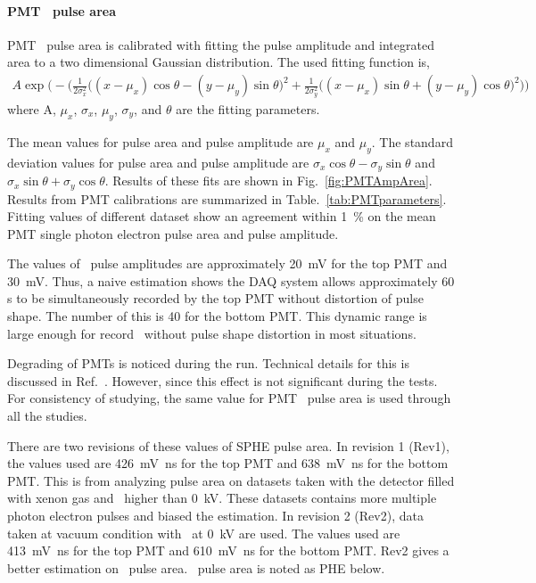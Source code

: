 \paragraph{PMT \sphe\ pulse area}
 PMT \sphe\ pulse area is calibrated with fitting the pulse amplitude and integrated area to a two dimensional Gaussian distribution. The used fitting function is, 
 \begin{align}
 	A \exp \bigg( -\Big(\frac{1}{2 \sigma_x^2} \big( (x-\mu_{x})\cos \theta - (y-\mu_y)\sin \theta \big) ^2 + \frac{1}{2 \sigma_y^2} \big( (x-\mu_{x})\sin \theta + (y-\mu_y)\cos \theta \big) ^2  \Big) \bigg)
 \end{align} 
where A, $\mu_{x}$, $\sigma_{x}$, $\mu_{y}$, $\sigma_{y}$, and $\theta$ are the fitting parameters.  

The mean values for pulse area and pulse amplitude are $\mu_{x}$ and $\mu_{y}$. The standard deviation values for pulse area and pulse amplitude are $\sigma_{x} \cos \theta - \sigma_{y} \sin \theta$ and $\sigma_{x} \sin \theta + \sigma_{y} \cos \theta$. Results of these fits are shown in Fig.~\ref{fig:PMTAmpArea}. Results from PMT calibrations are summarized in Table.~\ref{tab:PMTparameters}. Fitting values of different dataset show an agreement within \SI{1}{\percent} on the mean PMT single photon electron pulse area and pulse amplitude. 

The values of \sphe\ pulse amplitudes are approximately \SI{20}{\mV} for the top PMT and \SI{30}{\mV}. Thus, a naive estimation shows the DAQ system allows approximately 60 \sphe s to be simultaneously recorded by the top PMT without distortion of pulse shape. The number of this is 40 for the bottom PMT. This dynamic range is large enough for record \eep\ without pulse shape distortion in most situations. 

Degrading of PMTs is noticed during the run. Technical details for this is discussed in Ref.~\cite{HamamatsuPhotonics2006}. However, since this effect is not significant during the tests. For consistency of studying, the same value for PMT \sphe\ pulse area is used through all the studies. 

There are two revisions of these values of SPHE pulse area. In revision 1 (Rev1), the values used are \SI{426}{\mV\ns} for the top PMT and \SI{638}{\mV\ns} for the bottom PMT. This is from analyzing pulse area on datasets taken with the detector filled with xenon gas and \opvtvb\ higher than \SI{0}{\kV}. These datasets contains more multiple photon electron pulses and biased the estimation. In revision 2 (Rev2), data taken at vacuum condition with \opvtvb\ at \SI{0}{\kV} are used. The values used are \SI{413}{\mV\ns} for the top PMT and \SI{610}{\mV\ns} for the bottom PMT. Rev2 gives a better estimation on \sphe\ pulse area. \sphe\ pulse area is noted as PHE below.

